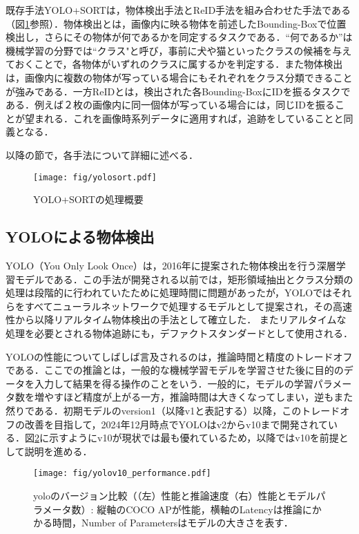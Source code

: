 既存手法YOLO+SORTは，物体検出手法とReID手法を組み合わせた手法である（図\ref{fig:YOLO+SORT}参照）．物体検出とは，画像内に映る物体を前述したBounding-Boxで位置検出し，さらにその物体が何であるかを同定するタスクである．``何であるか''は機械学習の分野では``クラス"と呼び，事前に犬や猫といったクラスの候補を与えておくことで，各物体がいずれのクラスに属するかを判定する．また物体検出は，画像内に複数の物体が写っている場合にもそれぞれをクラス分類できることが強みである．一方ReIDとは，検出された各Bounding-BoxにIDを振るタスクである．例えば２枚の画像内に同一個体が写っている場合には，同じIDを振ることが望まれる．これを画像時系列データに適用すれば，追跡をしていることと同義となる．
\par
以降の節で，各手法について詳細に述べる．

\begin{figure}[t]
    \centering
    \texttt{[image: fig/yolosort.pdf]}
    \caption[YOLO+SORTの処理概要]{YOLO+SORTの処理概要}
    \label{fig:YOLO+SORT}
\end{figure}

    \subsection{YOLOによる物体検出}
    YOLO（You Only Look Once）は，2016年に提案された物体検出を行う深層学習モデルである．この手法が開発される以前では，矩形領域抽出とクラス分類の処理は段階的に行われていた\cite{girshick2014rich,girshick2015fast,ren2016faster}ために処理時間に問題があったが，YOLOではそれらをすべてニューラルネットワークで処理するモデルとして提案され，その高速性から以降リアルタイム物体検出の手法として確立した．
    またリアルタイムな処理を必要とされる物体追跡にも，デファクトスタンダードとして使用される．
    \par
    YOLOの性能についてしばしば言及されるのは，推論時間と精度のトレードオフである．ここでの推論とは，一般的な機械学習モデルを学習させた後に目的のデータを入力して結果を得る操作のことをいう．一般的に，モデルの学習パラメータ数を増やすほど精度が上がる一方，推論時間は大きくなってしまい，逆もまた然りである．初期モデルのversion1（以降v1と表記する）以降，このトレードオフの改善を目指して，2024年12月時点でYOLOはv2からv10まで開発されている．図\ref{fig:v10_performance}に示すようにv10が現状では最も優れているため，以降ではv10を前提として説明を進める．

    \begin{figure}[t]
        \centering
        \texttt{[image: fig/yolov10\_performance.pdf]}
        \caption[yoloのバージョン比較（（左）性能と推論速度（右）性能とモデルパラメータ数）]{yoloのバージョン比較（（左）性能と推論速度（右）性能とモデルパラメータ数）: 縦軸の\textrm{COCO AP}が性能，横軸の\textrm{Latency}は推論にかかる時間，\textrm{Number of Parameters}はモデルの大きさを表す．}
        \label{fig:v10_performance}
    \end{figure}

